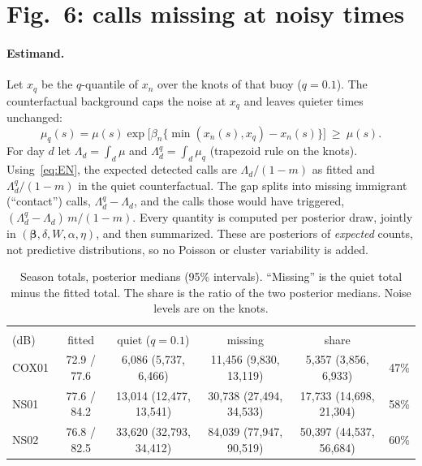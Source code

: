 \documentclass[11pt]{article}
\newcommand{\bb}{\bm{\beta}}
\begin{document}
\section{Fig.~6: calls missing at noisy times}\label{sec:fig6}

\paragraph{Estimand.}
Let $x_q$ be the $q$-quantile of $x_n$ over the knots of that buoy ($q=0.1$).
The counterfactual background caps the noise at $x_q$ and leaves quieter
times unchanged:
\begin{equation}\label{eq:cap}
\mu_q(s)=\mu(s)\exp\bigl[\beta_n\{\min(x_n(s),x_q)-x_n(s)\}\bigr]\ \ge\ \mu(s).
\end{equation}
For day $d$ let $\Lambda_d=\int_d\mu$ and $\Lambda^q_d=\int_d\mu_q$ (trapezoid
rule on the knots). Using~\eqref{eq:EN}, the expected detected calls are
$\Lambda_d/(1-m)$ as fitted and $\Lambda^q_d/(1-m)$ in the quiet
counterfactual. The gap splits into missing immigrant (``contact'') calls,
$\Lambda^q_d-\Lambda_d$, and the calls those would have triggered,
$(\Lambda^q_d-\Lambda_d)\,m/(1-m)$. Every quantity is computed per posterior
draw, jointly in $(\bb,\delta,W,\alpha,\eta)$, and then summarized. These are
posteriors of \emph{expected} counts, not predictive distributions, so no
Poisson or cluster variability is added.

\begin{table}[H]
\centering\small
\caption{Season totals, posterior medians (95\% intervals). ``Missing'' is
the quiet total minus the fitted total. The share is the ratio of the two
posterior medians. Noise levels are on the knots.}
\label{tab:quiet}
\footnotesize\setlength{\tabcolsep}{4pt}
\begin{tabular}{lccccc}
\toprule
& \shortstack{$L_{0.1}$ / median $L$\\(dB)} & fitted & quiet ($q=0.1$) & missing & share\\
\midrule
COX01 & 72.9 / 77.6 & 6{,}086 (5{,}737, 6{,}466) & 11{,}456 (9{,}830, 13{,}119) & 5{,}357 (3{,}856, 6{,}933) & 47\%\\
NS01 & 77.6 / 84.2 & 13{,}014 (12{,}477, 13{,}541) & 30{,}738 (27{,}494, 34{,}533) & 17{,}733 (14{,}698, 21{,}304) & 58\%\\
NS02 & 76.8 / 82.5 & 33{,}620 (32{,}793, 34{,}412) & 84{,}039 (77{,}947, 90{,}519) & 50{,}397 (44{,}537, 56{,}684) & 60\%\\
\bottomrule
\end{tabular}
\end{table}
\end{document}
